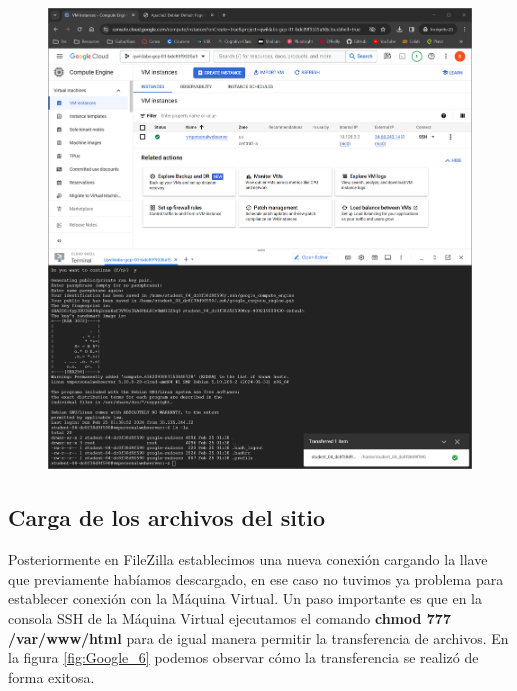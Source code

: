 \documentclass[12pt,a4paper]{article}
\begin{document}
\begin{figure}[H]
    \centering
    \includegraphics[width=1\linewidth]{M4_Servicios_Cómputo_en_la_Nube/Tarea_5_Creación_Máquinas_Virtuales_en_Nube/reporte/figuras/2_3_2_Configuración_Pública.png}
    \label{fig:Google_5}
\end{figure}

\subsection{Carga de los archivos del sitio}

Posteriormente en FileZilla establecimos una nueva conexión cargando la llave que previamente habíamos descargado, en ese caso no tuvimos ya problema para establecer conexión con la Máquina Virtual. Un paso importante es que en la consola SSH de la Máquina Virtual ejecutamos el comando \textbf{chmod 777 /var/www/html} para de igual manera permitir la transferencia de archivos. En la figura \ref{fig:Google_6} podemos observar cómo la transferencia se realizó de forma exitosa.
\end{document}
